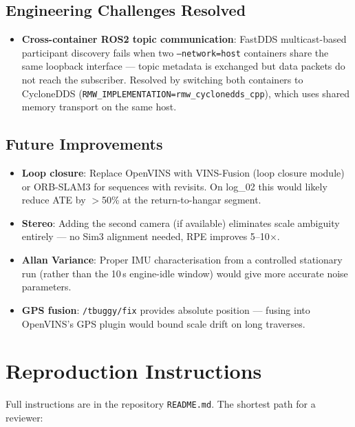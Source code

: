 \documentclass[10pt,a4paper]{article}
\begin{document}
\subsection{Engineering Challenges Resolved}

\begin{itemize}[nosep]
  \item \textbf{Cross-container ROS2 topic communication}: FastDDS multicast-based
    participant discovery fails when two \texttt{--network=host} containers share the same
    loopback interface --- topic metadata is exchanged but data packets do not reach the
    subscriber. Resolved by switching both containers to CycloneDDS
    (\texttt{RMW\_IMPLEMENTATION=rmw\_cyclonedds\_cpp}), which uses shared memory
    transport on the same host.
\end{itemize}

\subsection{Future Improvements}

\begin{itemize}[nosep]
  \item \textbf{Loop closure}: Replace OpenVINS with VINS-Fusion (loop closure module) or
    ORB-SLAM3 for sequences with revisits. On log\_02 this would likely reduce ATE by
    $>$50\% at the return-to-hangar segment.
  \item \textbf{Stereo}: Adding the second camera (if available) eliminates scale ambiguity
    entirely --- no Sim3 alignment needed, RPE improves 5--10$\times$.
  \item \textbf{Allan Variance}: Proper IMU characterisation from a controlled stationary
    run (rather than the 10\,s engine-idle window) would give more accurate noise parameters.
  \item \textbf{GPS fusion}: \texttt{/tbuggy/fix} provides absolute position --- fusing into
    OpenVINS's GPS plugin would bound scale drift on long traverses.
\end{itemize}

\section*{Reproduction Instructions}

Full instructions are in the repository \texttt{README.md}. The shortest path for a reviewer:
\end{document}

